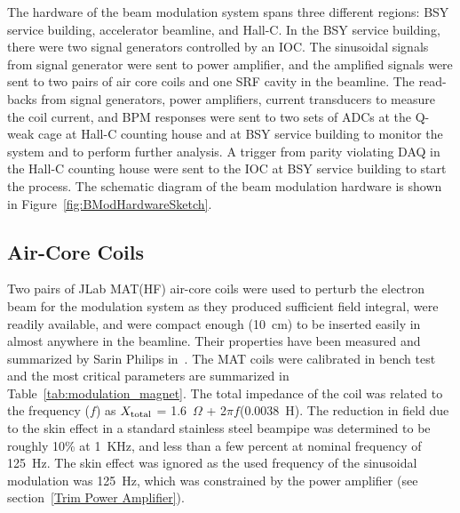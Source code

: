 The hardware of the beam modulation system spans three different regions: BSY service building, accelerator beamline, and Hall-C. In the BSY service building, there were two signal generators controlled by an IOC. The sinusoidal signals from signal generator were sent to power amplifier, and the amplified signals were sent to two pairs of air core coils and one SRF cavity in the beamline. The read-backs from signal generators, power amplifiers, current transducers to measure the coil current, and BPM responses were sent to two sets of ADCs at the Q-weak cage at Hall-C counting house and at BSY service building to monitor the system and to perform further analysis. A trigger from parity violating DAQ in the Hall-C counting house were sent to the IOC at BSY service building to start the process. The schematic diagram of the beam modulation hardware is shown in Figure~\ref{fig:BModHardwareSketch}.

\subsection{Air-Core Coils}
\label{Air-Core Coils}
Two pairs of JLab MAT(HF) air-core coils were used to perturb the electron beam for the modulation system as they produced sufficient field integral, were readily available, and were compact enough (10~cm) to be inserted easily in almost anywhere in the beamline. Their properties have been measured and summarized by Sarin Philips in~\cite{DocDB:sarin_979}. The MAT coils were calibrated in bench test and the most critical parameters are summarized in Table~\ref{tab:modulation_magnet}. The total impedance of the coil was related to the frequency ($f$) as $X_{\rm total}$ = 1.6~$\Omega$ + 2$\pi f$(0.0038~H). The reduction in field due to the skin effect in a standard stainless steel beampipe was determined to be roughly 10\% at 1~KHz, and less than a few percent at nominal frequency of 125~Hz. The skin effect was ignored as the used frequency of the sinusoidal modulation was 125~Hz, which was constrained by the power amplifier (see section~\ref{Trim Power Amplifier}). 

